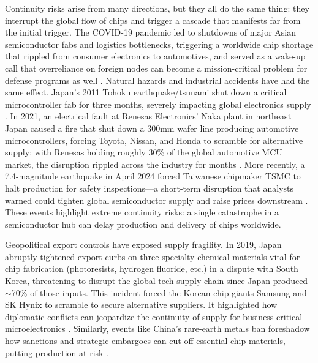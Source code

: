 Continuity risks arise from many directions, but they all do the same thing: they interrupt the global flow of chips and trigger a cascade that manifests far from the initial trigger. The COVID-19 pandemic led to shutdowns of major Asian semiconductor fabs and logistics bottlenecks, triggering a worldwide chip shortage that rippled from consumer electronics to automotives, and served as a wake-up call that overreliance on foreign nodes can become a mission-critical problem for defense programs as well \parencite{wasser_when_2022,department_of_defense_assured_2025,usdoe_office_of_energy_efficiency_and_renewable_energy_eere_semiconductor_2022}. Natural hazards and industrial accidents have had the same effect. Japan's 2011 Tohoku earthquake/tsunami shut down a critical microcontroller fab for three months, severely impacting global electronics supply \parencite{matsuo_implications_2015}. In 2021, an electrical fault at Renesas Electronics' Naka plant in northeast Japan caused a fire that shut down a 300mm wafer line producing automotive microcontrollers, forcing Toyota, Nissan, and Honda to scramble for alternative supply; with Renesas holding roughly 30\% of the global automotive MCU market, the disruption rippled across the industry for months \parencite{reuters_japanese_2021}. More recently, a 7.4-magnitude earthquake in April 2024 forced Taiwanese chipmaker TSMC to halt production for safety inspections---a short-term disruption that analysts warned could tighten global semiconductor supply and raise prices downstream \parencite{usgs_hualien_2024,reuters_tsmc_earthquake_2024}. These events highlight extreme continuity risks: a single catastrophe in a semiconductor hub can delay production and delivery of chips worldwide.

Geopolitical export controls have exposed supply fragility. In 2019, Japan abruptly tightened export curbs on three specialty chemical materials vital for chip fabrication (photoresists, hydrogen fluoride, etc.) in a dispute with South Korea, threatening to disrupt the global tech supply chain since Japan produced $\sim$70\% of those inputs. This incident forced the Korean chip giants Samsung and SK Hynix to scramble to secure alternative suppliers. It highlighted how diplomatic conflicts can jeopardize the continuity of supply for business-critical microelectronics \parencite{yamazaki_japans_2019, kim_potential_2019, usitc_japan_korea_2020}. Similarly, events like China's rare-earth metals ban foreshadow how sanctions and strategic embargoes can cut off essential chip materials, putting production at risk \parencite{mak_chips-for-rare-earths_2025, csis_china_rare_earth_2025}.

